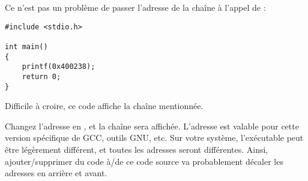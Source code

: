 Ce n'est pas un problème de passer l'adresse de la chaîne  à l'appel de :

\begin{lstlisting}[style=customc]
#include <stdio.h>

int main()
{
    printf(0x400238);
    return 0;
}
\end{lstlisting}

Difficile à croire, ce code affiche la chaîne mentionnée.

Changez l'adresse en , et la chaîne  sera affichée.
L'adresse est valable pour cette version spécifique de GCC, outils GNU, etc.
Sur votre système, l'exécutable peut être légèrement différent, et toutes les adresses seront différentes.
Ainsi, ajouter/supprimer du code à/de ce code source va probablement décaler les adresses en arrière et avant.

